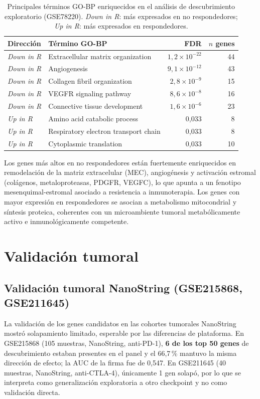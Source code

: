 \begin{table}[H]
\centering
\caption{Principales términos GO-BP enriquecidos en el análisis de descubrimiento exploratorio (GSE78220). \textit{Down in R}: más expresados en no respondedores; \textit{Up in R}: más expresados en respondedores.}
\label{tab:ora_gse78220}
\begin{tabularx}{\textwidth}{l l r r}
\toprule
Dirección & Término GO-BP & FDR & $n$ genes \\
\midrule
\textit{Down in R} & Extracellular matrix organization & $1{,}2\times10^{-22}$ & 44 \\
\textit{Down in R} & Angiogenesis & $9{,}1\times10^{-12}$ & 43 \\
\textit{Down in R} & Collagen fibril organization & $2{,}8\times10^{-9}$ & 15 \\
\textit{Down in R} & VEGFR signaling pathway & $8{,}6\times10^{-8}$ & 16 \\
\textit{Down in R} & Connective tissue development & $1{,}6\times10^{-6}$ & 23 \\
\midrule
\textit{Up in R} & Amino acid catabolic process & 0{,}033 & 8 \\
\textit{Up in R} & Respiratory electron transport chain & 0{,}033 & 8 \\
\textit{Up in R} & Cytoplasmic translation & 0{,}033 & 10 \\
\bottomrule
\end{tabularx}
\end{table}

Los genes más altos en no respondedores están fuertemente enriquecidos en remodelación de la matriz extracelular (MEC), angiogénesis y activación estromal (colágenos, metaloproteasas, PDGFR, VEGFC), lo que apunta a un fenotipo mesenquimal-estromal asociado a resistencia a inmunoterapia. Los genes con mayor expresión en respondedores se asocian a metabolismo mitocondrial y síntesis proteica, coherentes con un microambiente tumoral metabólicamente activo e inmunológicamente competente.

\section{Validación tumoral}

\subsection{Validación tumoral NanoString (GSE215868, GSE211645)}

La validación de los genes candidatos en las cohortes tumorales NanoString mostró solapamiento limitado, esperable por las diferencias de plataforma. En GSE215868 (105 muestras, NanoString, anti-PD-1), \textbf{6 de los top 50 genes} de descubrimiento estaban presentes en el panel y el 66{,}7\,\% mantuvo la misma dirección de efecto; la AUC de la firma fue de 0{,}547. En GSE211645 (40 muestras, NanoString, anti-CTLA-4), únicamente 1 gen solapó, por lo que se interpreta como generalización exploratoria a otro checkpoint y no como validación directa.

